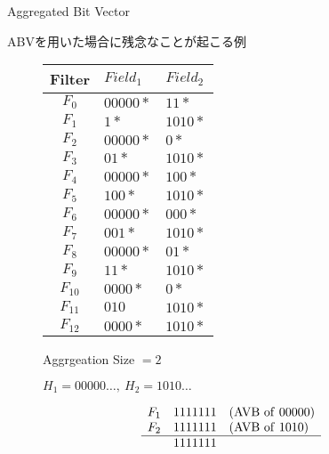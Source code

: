 \documentclass[a4paper,10pt]{jarticle}
\makeatletter
\newcommand{\tblcaption}[1]{\def\@captype{table}\caption{#1}}
\makeatother
\begin{document}
\begin{frame}{Aggregated Bit Vector}

\noindent ABVを用いた場合に残念なことが起こる例

\begin{figure}[h]
 \def\@captype{table}
 \begin{minipage}[t]{.4\textwidth}
  {\footnotesize
  {\centering
  \begin{tabular}{c|l|l} 
   Filter   & $Field_{1}$ & $Field_{2}$ \\ \hline
   $F_{0} $ & $00000*$    & $11*$   \\ \hline
   $F_{1} $ & $1*$        & $1010*$  \\ \hline
   $F_{2} $ & $00000*$    & $0*$    \\ \hline
   $F_{3} $ & $01*$       & $1010*$  \\ \hline
   $F_{4} $ & $00000*$    & $100*$   \\ \hline
   $F_{5} $ & $100*$      & $1010*$  \\ \hline
   $F_{6} $ & $00000*$    & $000*$  \\ \hline
   $F_{7} $ & $001*$      & $1010*$  \\ \hline
   $F_{8} $ & $00000*$    & $01*$   \\ \hline
   $F_{9} $ & $11*$      & $1010*$  \\ \hline
   $F_{10} $ & $0000*$    & $0*$   \\ \hline
   $F_{11} $ & $010$      & $1010*$  \\ \hline
   $F_{12} $ & $0000*$    & $1010*$   
  \end{tabular}

  }
  }
  \end{minipage}
  \hfill
  \begin{minipage}[c]{.55\textwidth}
  Aggrgeation Size $= 2$
  \par
  \vspace{5mm}

  $H_{1} = 00000 \dots, \ H_{2} = 1010 \dots $

   \begin{equation*}
    \begin{array}{lll}
     F_{1} & 1111111 & ({\rm AVB \ of \ } 00000) \\
     F_{2} & 1111111 & ({\rm AVB \ of \ } 1010) \\ \hline
           & 1111111 & 
    \end{array}
   \end{equation*}


\end{minipage}
\end{figure}
\end{frame}
\end{document}

